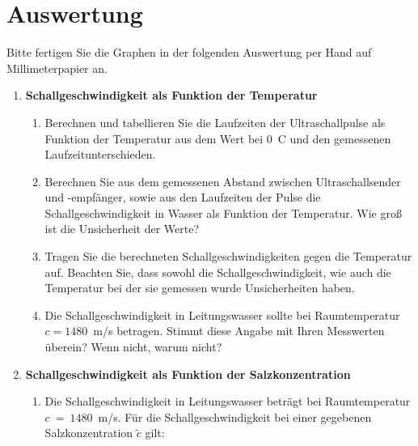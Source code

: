 \section{Auswertung} 

\begin{hint}
	Bitte fertigen Sie die Graphen in der folgenden Auswertung per Hand auf Millimeterpapier an.
\end{hint}

\begin{enumerate}
	\item\textbf{Schallgeschwindigkeit als Funktion der Temperatur}
	\begin{enumerate}
		\item Berechnen und tabellieren Sie die Laufzeiten der Ultraschallpulse als Funktion der Temperatur aus dem Wert bei 0\degree~C und den gemessenen Laufzeitunterschieden.
		\item Berechnen Sie aus dem gemessenen Abstand zwischen Ultraschallsender und -empfänger, sowie aus den Laufzeiten der Pulse die Schallgeschwindigkeit in Wasser als Funktion der Temperatur. Wie groß ist die Unsicherheit der Werte?
		\item Tragen Sie die berechneten Schallgeschwindigkeiten gegen die Temperatur auf. Beachten Sie, dass sowohl die Schallgeschwindigkeit, wie auch die Temperatur bei der sie gemessen wurde Unsicherheiten haben.
		\item Die Schallgeschwindigkeit in Leitungswasser sollte bei Raumtemperatur $c=1480$~m/s betragen. Stimmt diese Angabe mit Ihren Messwerten überein? Wenn nicht, warum nicht?
	\end{enumerate}
	\item \textbf{Schallgeschwindigkeit als Funktion der Salzkonzentration}
	\begin{enumerate}
		\item Die Schallgeschwindigkeit in Leitungswasser beträgt bei Raumtemperatur \\
		$c~=~1480$~m/s. Für die Schallgeschwindigkeit bei einer gegebenen Salzkonzentration $\tilde{c}$ gilt:

\end{enumerate}
\end{enumerate}
